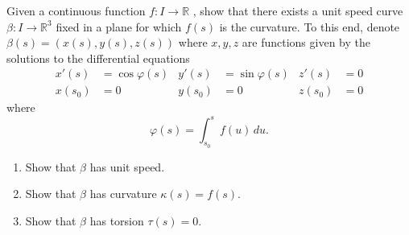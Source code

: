 \documentclass[12 pt, letterpaper]{hmcpset}
\begin{document}
\pagebreak

\begin{problem}[Problem 3.]
	Given a continuous function $f : I \to \mathbb{R}$ , show that there exists a unit speed curve $\beta : I \to \mathbb{R}^{3}$  fixed in a plane for which $f(s)$  is the curvature. To this end, denote $\beta(s) = (x(s), y(s), z(s))$  where $x, y, z$  are functions given by the solutions to the differential equations
	\begin{align*}
		x'(s) & = \cos{\varphi(s)} & y'(s) & = \sin{\varphi(s)} & z'(s) & = 0 \\
		x(s_{0}) & = 0 & y(s_{0}) & = 0 & z(s_{0}) & = 0
	\end{align*}
	where
	\[
		\varphi(s) = \int_{s_{0}}^{s} f(u) \, du.
	\]
	\begin{enumerate}
		\item Show that $\beta$ has unit speed.
		\item Show that $\beta$ has curvature $\kappa(s) = f(s)$.
		\item Show that $\beta$ has torsion $\tau(s) = 0$.
	\end{enumerate}
\end{problem}
\end{document}
